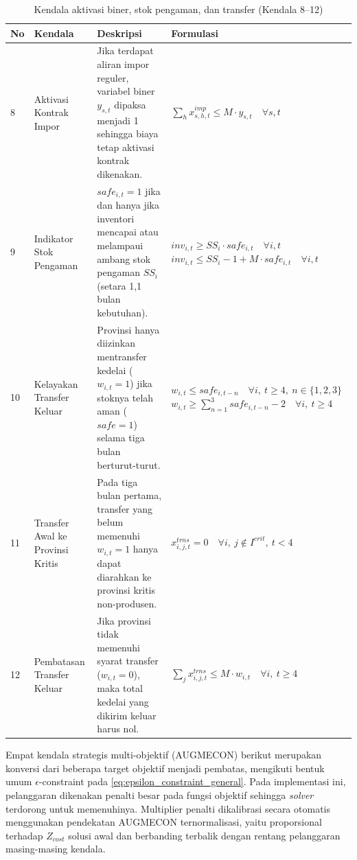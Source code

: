 \documentclass{file/TA-ITS}
\theoremstyle{definition}
\theoremstyle{definition}
\theoremstyle{plain}
\begin{document}
\begin{table}[H]
\centering
\caption{Kendala aktivasi biner, stok pengaman, dan transfer (Kendala 8--12)}
\label{tab:kendala_biner_stok}
\scriptsize
\renewcommand{\arraystretch}{1.5}
\begin{tabularx}{\textwidth}{@{}p{}p{}p{}X@{}}
\toprule
\textbf{No} & \textbf{Kendala} & \textbf{Deskripsi} & \textbf{Formulasi} \\
\midrule
8 & Aktivasi Kontrak Impor & Jika terdapat aliran impor reguler, variabel biner $y_{s,t}$ dipaksa menjadi 1 sehingga biaya tetap aktivasi kontrak dikenakan. & $\sum_h x^{imp}_{s,h,t} \leq M \cdot y_{s,t} \quad \forall s,t$ \\
9 & Indikator Stok Pengaman & $safe_{i,t}=1$ jika dan hanya jika inventori mencapai atau melampaui ambang stok pengaman $SS_i$ (setara 1,1 bulan kebutuhan). & $inv_{i,t} \geq SS_i \cdot safe_{i,t} \quad \forall i,t$ \newline $inv_{i,t} \leq SS_i - 1 + M \cdot safe_{i,t} \quad \forall i,t$ \\
10 & Kelayakan Transfer Keluar & Provinsi hanya diizinkan mentransfer kedelai ($w_{i,t}=1$) jika stoknya telah aman ($safe=1$) selama tiga bulan berturut-turut. & $w_{i,t} \leq safe_{i,t-n} \quad \forall i,\ t \geq 4,\ n \in \{1,2,3\}$ \newline $w_{i,t} \geq \sum_{n=1}^{3} safe_{i,t-n} - 2 \quad \forall i,\ t \geq 4$ \\
11 & Transfer Awal ke Provinsi Kritis & Pada tiga bulan pertama, transfer yang belum memenuhi $w_{i,t}=1$ hanya dapat diarahkan ke provinsi kritis non-produsen. & $x^{trns}_{i,j,t}=0 \quad \forall i,\ j\notin I^{crit},\ t<4$ \\
12 & Pembatasan Transfer Keluar & Jika provinsi tidak memenuhi syarat transfer ($w_{i,t}=0$), maka total kedelai yang dikirim keluar harus nol. & $\sum_j x^{trns}_{i,j,t} \leq M \cdot w_{i,t} \quad \forall i,\ t\geq4$ \\
\bottomrule
\end{tabularx}
\renewcommand{\arraystretch}{1}
\end{table}

Empat kendala strategis multi-objektif (AUGMECON) berikut merupakan konversi dari beberapa target objektif menjadi pembatas, mengikuti bentuk umum \(\epsilon\)-constraint pada \ref{eq:epsilon_constraint_general}. Pada implementasi ini, pelanggaran dikenakan penalti besar pada fungsi objektif sehingga \textit{solver} terdorong untuk memenuhinya. Multiplier penalti dikalibrasi secara otomatis menggunakan pendekatan AUGMECON ternormalisasi, yaitu proporsional terhadap \(Z_{cost}\) solusi awal dan berbanding terbalik dengan rentang pelanggaran masing-masing kendala.
\end{document}
